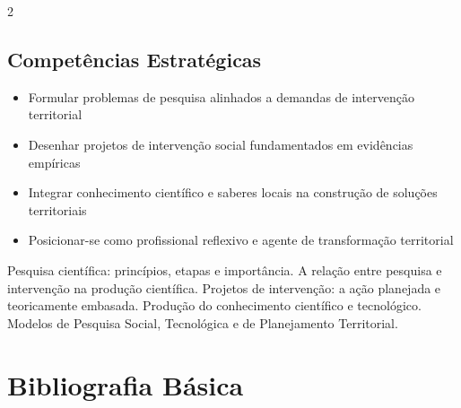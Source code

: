 \documentclass[11pt,a4paper]{article}
\begin{document}
\begin{multicols}{2}
\subsection*{Competências Estratégicas}
\begin{itemize}
\item Formular problemas de pesquisa alinhados a demandas de intervenção territorial
\item Desenhar projetos de intervenção social fundamentados em evidências empíricas
\item Integrar conhecimento científico e saberes locais na construção de soluções territoriais
\item Posicionar-se como profissional reflexivo e agente de transformação territorial
\end{itemize}
\end{multicols}

\begin{tcolorbox}[ementabox]
Pesquisa científica: princípios, etapas e importância. A relação entre pesquisa e intervenção na produção científica. Projetos de intervenção: a ação planejada e teoricamente embasada. Produção do conhecimento científico e tecnológico. Modelos de Pesquisa Social, Tecnológica e de Planejamento Territorial.
\end{tcolorbox}

\section*{Bibliografia Básica}
\end{document}
